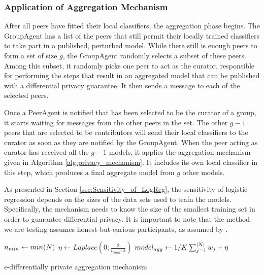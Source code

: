 \subsubsection{Application of Aggregation Mechanism}

After all peers have fitted their local classifiers, the aggregation phase begins. The GroupAgent has a list of the peers that still permit their locally trained classifiers to take part in a published, perturbed model. While there still is enough peers to form a set of size $g$, the GroupAgent randomly selects a subset of these peers. Among this subset, it randomly picks one peer to act as the curator, responsible for performing the steps that result in an aggregated model that can be published with a differential privacy guarantee. It then sends a message to each of the selected peers.

Once a PeerAgent is notified that has been selected to be the curator of a group, it starts waiting for messages from the other peers in the set. The other $g-1$ peers that are selected to be contributors will send their local classifiers to the curator as soon as they are notified by the GroupAgent. When the peer acting as curator has received all the $g-1$ models, it applies the aggregation mechanism given in Algorithm \ref{alg:privacy_mechanism}. It includes its own local classifier in this step, which produces a final aggregate model from $g$ other models. 

As presented in Section \ref{sec:Sensitivity_of_LogReg}, the sensitivity of logistic regression depends on the sizes of the data sets used to train the models. Specifically, the mechanism needs to know the size of the smallest training set in order to guarantee differential privacy. It is important to note that the method we are testing assumes honest-but-curious participants, as assumed by \cite{pathak2010diffprivhomo}.


\begin{algorithm}[!h]
	
	$n_{min} \leftarrow min(\boldmath{N})$\;
	$\eta \leftarrow Laplace(0; \frac{2}{n_{min}\epsilon\lambda})$\;
	$model_{agg} \leftarrow 1/K\sum_{j=1}^{|\boldmath{N}|} \boldmath{w_j} + \boldmath{\eta}$\;
	
	\caption{$\epsilon$-differentially private aggregation mechanism}
	\label{alg:privacy_mechanism}
\end{algorithm}


